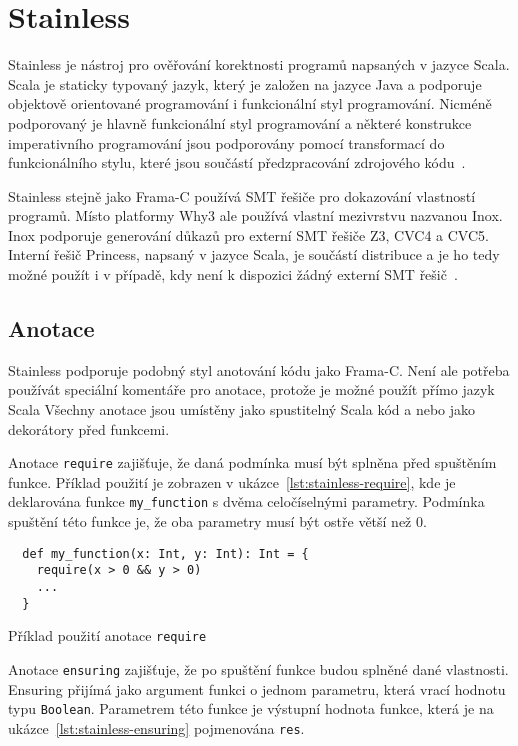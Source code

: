 \chapter{Stainless}
\label{ch:stainless}

Stainless je nástroj pro ověřování korektnosti programů napsaných v jazyce Scala.
Scala je staticky typovaný jazyk, který je založen na jazyce Java
a podporuje objektově orientované programování i funkcionální styl programování.
Nicméně podporovaný je hlavně funkcionální styl programování a některé konstrukce
imperativního programování jsou podporovány pomocí transformací do funkcionálního stylu,
které jsou součástí předzpracování zdrojového kódu~\cite{StainlessDocs}.

Stainless stejně jako Frama\mbox{-}C používá SMT řešiče pro dokazování vlastností programů.
Místo platformy Why3 ale používá vlastní mezivrstvu nazvanou Inox.
Inox podporuje generování důkazů pro externí SMT řešiče Z3, CVC4 a CVC5.
Interní řešič Princess, napsaný v jazyce Scala, je součástí distribuce a je ho tedy možné použít
i v případě, kdy není k dispozici žádný externí SMT řešič~\cite{InoxSolver}.

\section{Anotace}
\label{sec:stainless-annotations}

Stainless podporuje podobný styl anotování kódu jako Frama\mbox{-}C\@.
Není ale potřeba používát speciální komentáře pro anotace,
protože je možné použít přímo jazyk Scala
Všechny anotace jsou umístěny jako spustitelný Scala kód a nebo jako dekorátory před funkcemi.

Anotace \texttt{require} zajišťuje, že daná podmínka musí být splněna před spuštěním funkce.
Příklad použití je zobrazen v ukázce~\ref{lst:stainless-require},
kde je deklarována funkce \texttt{my\_function} s dvěma celočíselnými parametry.
Podmínka spuštění této funkce je, že oba parametry musí být ostře větší než 0.

\begin{listing}[H]
  \begin{verbatim}
  def my_function(x: Int, y: Int): Int = {
    require(x > 0 && y > 0)
    ...
  }
  \end{verbatim}
  \caption{Příklad použití anotace \texttt{require}}
  \label{lst:stainless-require}
\end{listing}

Anotace \texttt{ensuring} zajišťuje, že po spuštění funkce budou splněné dané vlastnosti.
Ensuring přijímá jako argument funkci o jednom parametru,
která vrací hodnotu typu \texttt{Boolean}.
Parametrem této funkce je výstupní hodnota funkce,
která je na ukázce~\ref{lst:stainless-ensuring} pojmenována \texttt{res}.

